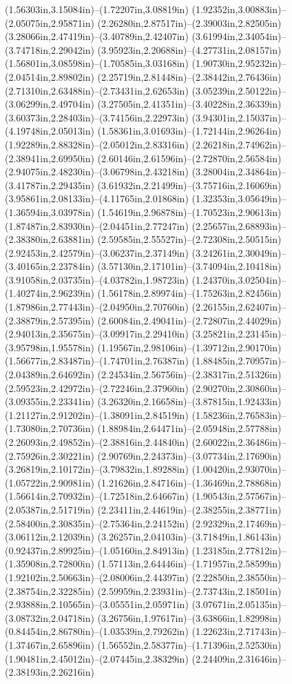 (1.56303in,3.15084in)--(1.72207in,3.08819in) (1.92352in,3.00883in)--(2.05075in,2.95871in) (2.26280in,2.87517in)--(2.39003in,2.82505in) (3.28066in,2.47419in)--(3.40789in,2.42407in) (3.61994in,2.34054in)--(3.74718in,2.29042in) (3.95923in,2.20688in)--(4.27731in,2.08157in) (1.56801in,3.08598in)--(1.70585in,3.03168in) (1.90730in,2.95232in)--(2.04514in,2.89802in) (2.25719in,2.81448in)--(2.38442in,2.76436in) (2.71310in,2.63488in)--(2.73431in,2.62653in) (3.05239in,2.50122in)--(3.06299in,2.49704in) (3.27505in,2.41351in)--(3.40228in,2.36339in) (3.60373in,2.28403in)--(3.74156in,2.22973in) (3.94301in,2.15037in)--(4.19748in,2.05013in) (1.58361in,3.01693in)--(1.72144in,2.96264in) (1.92289in,2.88328in)--(2.05012in,2.83316in) (2.26218in,2.74962in)--(2.38941in,2.69950in) (2.60146in,2.61596in)--(2.72870in,2.56584in) (2.94075in,2.48230in)--(3.06798in,2.43218in) (3.28004in,2.34864in)--(3.41787in,2.29435in) (3.61932in,2.21499in)--(3.75716in,2.16069in) (3.95861in,2.08133in)--(4.11765in,2.01868in) (1.32353in,3.05649in)--(1.36594in,3.03978in) (1.54619in,2.96878in)--(1.70523in,2.90613in) (1.87487in,2.83930in)--(2.04451in,2.77247in) (2.25657in,2.68893in)--(2.38380in,2.63881in) (2.59585in,2.55527in)--(2.72308in,2.50515in) (2.92453in,2.42579in)--(3.06237in,2.37149in) (3.24261in,2.30049in)--(3.40165in,2.23784in) (3.57130in,2.17101in)--(3.74094in,2.10418in) (3.91058in,2.03735in)--(4.03782in,1.98723in) (1.24370in,3.02504in)--(1.40274in,2.96239in) (1.56178in,2.89974in)--(1.75263in,2.82456in) (1.87986in,2.77443in)--(2.04950in,2.70760in) (2.26155in,2.62407in)--(2.38879in,2.57395in) (2.60084in,2.49041in)--(2.72807in,2.44029in) (2.94013in,2.35675in)--(3.09917in,2.29410in) (3.25821in,2.23145in)--(3.95798in,1.95578in) (1.19567in,2.98106in)--(1.39712in,2.90170in) (1.56677in,2.83487in)--(1.74701in,2.76387in) (1.88485in,2.70957in)--(2.04389in,2.64692in) (2.24534in,2.56756in)--(2.38317in,2.51326in) (2.59523in,2.42972in)--(2.72246in,2.37960in) (2.90270in,2.30860in)--(3.09355in,2.23341in) (3.26320in,2.16658in)--(3.87815in,1.92433in) (1.21127in,2.91202in)--(1.38091in,2.84519in) (1.58236in,2.76583in)--(1.73080in,2.70736in) (1.88984in,2.64471in)--(2.05948in,2.57788in) (2.26093in,2.49852in)--(2.38816in,2.44840in) (2.60022in,2.36486in)--(2.75926in,2.30221in) (2.90769in,2.24373in)--(3.07734in,2.17690in) (3.26819in,2.10172in)--(3.79832in,1.89288in) (1.00420in,2.93070in)--(1.05722in,2.90981in) (1.21626in,2.84716in)--(1.36469in,2.78868in) (1.56614in,2.70932in)--(1.72518in,2.64667in) (1.90543in,2.57567in)--(2.05387in,2.51719in) (2.23411in,2.44619in)--(2.38255in,2.38771in) (2.58400in,2.30835in)--(2.75364in,2.24152in) (2.92329in,2.17469in)--(3.06112in,2.12039in) (3.26257in,2.04103in)--(3.71849in,1.86143in) (0.92437in,2.89925in)--(1.05160in,2.84913in) (1.23185in,2.77812in)--(1.35908in,2.72800in) (1.57113in,2.64446in)--(1.71957in,2.58599in) (1.92102in,2.50663in)--(2.08006in,2.44397in) (2.22850in,2.38550in)--(2.38754in,2.32285in) (2.59959in,2.23931in)--(2.73743in,2.18501in) (2.93888in,2.10565in)--(3.05551in,2.05971in) (3.07671in,2.05135in)--(3.08732in,2.04718in) (3.26756in,1.97617in)--(3.63866in,1.82998in) (0.84454in,2.86780in)--(1.03539in,2.79262in) (1.22623in,2.71743in)--(1.37467in,2.65896in) (1.56552in,2.58377in)--(1.71396in,2.52530in) (1.90481in,2.45012in)--(2.07445in,2.38329in) (2.24409in,2.31646in)--(2.38193in,2.26216in) 